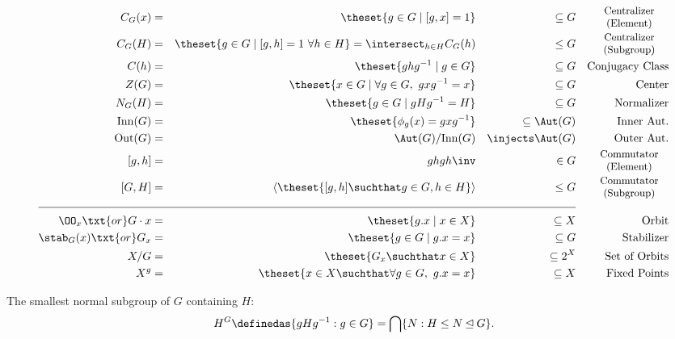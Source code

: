 \begin{align*}
C_G(x)          =       &&  \theset{g\in G \mid [g, x] = 1}                 &&  \subseteq G       &&  
\parbox{7em}{\small\centering Centralizer \\ (Element)} \\
C_G(H)          =       &&  \theset{g\in G \mid [g, h] = 1 ~\forall h\in H} = \intersect_{h\in H} C_G(h)                 &&  \leq G       &&  
\parbox{7em}{\small\centering Centralizer \\ (Subgroup)} \\
C(h)        =       &&  \theset{ghg^{-1} \mid g\in G}                     &&  \subseteq G       &&  
\text{Conjugacy Class} \\
Z(G)            =       &&  \theset{x\in G \mid \forall g\in G,~ gxg^{-1} = x} &&  \subseteq G       &&  
\text{Center} \\
N_G(H)          =       &&  \theset{g\in G \mid gHg^{-1} = H}                  &&  \subseteq G       &&  
\text{Normalizer} \\
\mathrm{Inn}(G) = &&  \theset{\phi_g(x) = gxg^{-1} }                 &&  \subseteq \Aut(G) &&  
\text{Inner Aut.} \\
\mathrm{Out}(G) = &&  \Aut(G) / \mathrm{Inn}(G)                      &&  \injects \Aut(G)  &&  
\text{Outer Aut.} \\
[g, h] = &&  ghgh\inv                      &&  \in G  &&  
\parbox{7em}{\small\centering Commutator \\ (Element)} \\
[G, H] = && \left\langle \theset{[g,h] \suchthat g\in G, h\in H} \right\rangle  &&  \leq G  &&  
\parbox{7em}{\small\centering Commutator \\ (Subgroup)} \\
\cline{1-6}
\OO_x\txt{or} G\cdot x          =       &&  \theset{g.x \mid x\in X}                          &&  \subseteq X       &&  
\text{Orbit} \\
\stab_G(x)\txt{or}  G_x             =       &&  \theset{g\in G \mid g.x = x}                      &&  \subseteq G       &&  
\text{Stabilizer} \\
X/G = && \theset{G_x \suchthat x\in X} && \subseteq 2^X && 
\text{Set of Orbits} \\
X^{g} = && \theset{x\in X \suchthat \forall g\in G,~ g.x = x} && \subseteq X && 
\text{Fixed Points} \\
\end{align*}

\begin{definition}

The smallest normal subgroup of \(G\) containing \(H\):
\begin{align*}
H^G \definedas \{gHg^{-1}: g\in G\} = \bigcap \{ N: H \leq N \unlhd G \}
.\end{align*}

\end{definition}

